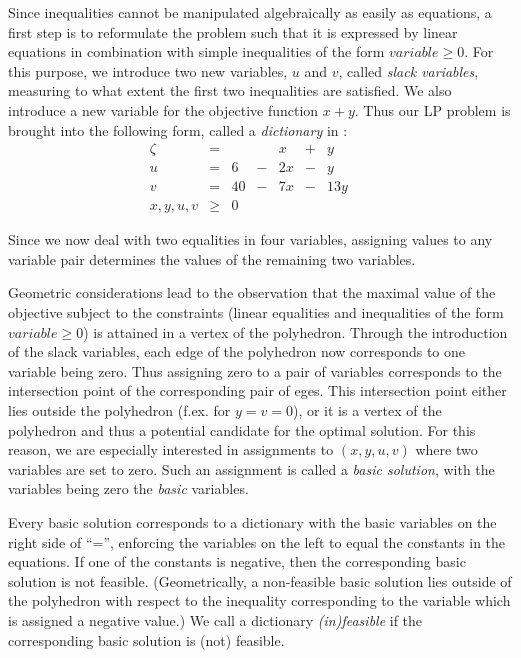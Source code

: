 \documentclass[ukenglish]{nik}
\begin{document}
Since inequalities cannot be manipulated algebraically as easily
as equations, a first step is to reformulate the problem such that it is expressed
by linear equations in combination with simple inequalities of the form
$\mathit{variable}\geq 0$. For this purpose, we introduce
two new variables, $u$ and $v$, called \emph{slack variables}, measuring to what extent the first
two inequalities are satisfied. 
We also introduce a new variable
for the objective function $x+y$. Thus our LP problem is brought into the following form, 
called a \emph{dictionary} in \cite{Vanderbei}:
\[    
    \begin{array}{lcrcrcrcr}
      \zeta&=&   & &     x &+&     y & &  \\\hline
      u    &=& 6 &-&   2 x &-&     y & &  \\
      v    &=& 40&-&   7 x &-&  13 y & &  \\
      x,y,u,v  &\geq&0     & &  & &  & &    
    \end{array}
\]

Since we now deal with two equalities in four variables, 
assigning values to any variable pair determines the values of the remaining two variables.

Geometric considerations lead to the observation that the
maximal value of the objective subject to the constraints (linear
equalities and inequalities of the form 
$\mathit{variable}\geq 0$) is attained in a vertex of the polyhedron. 
Through the introduction of the slack variables, each edge of the polyhedron now corresponds to one variable
being zero. Thus assigning zero to a pair of variables corresponds to the intersection point of the corresponding pair of eges. 
This intersection point either lies outside the polyhedron (f.ex. for $y=v=0$), or  
it is a vertex of the polyhedron and thus a potential candidate for the optimal solution. 
For this reason, we are especially interested in assignments to $(x,y,u,v)$ where two variables are set to zero. 
Such an assignment is called a \emph{basic solution}, with the variables being zero the \emph{basic} variables.

Every basic solution corresponds to a dictionary with the basic variables on the right side of ``='', 
enforcing the variables on the left to equal the constants in the equations. 
If one of the constants is negative, then the corresponding basic solution is not feasible. 
(Geometrically, a non-feasible basic solution lies outside of the polyhedron with respect to the inequality corresponding to the 
variable which is assigned a negative value.)
We  call a dictionary \emph{(in)feasible} if the corresponding basic solution is (not) feasible.
\end{document}

